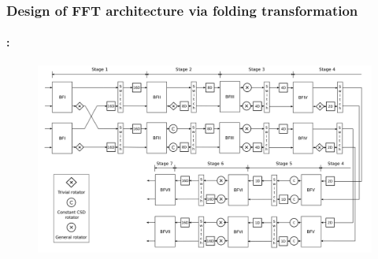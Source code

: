 \begin{frame}
	\frametitle{\textbf{Design of FFT architecture via folding transformation}}
	\framesubtitle{\secname : \subsecname}
	\vspace{-0.5cm}
		\begin{figure}[h!] \centering
		   	\includegraphics[width=0.875\paperwidth]{./image/folding-128.png}
		\end{figure}  	
\end{frame}